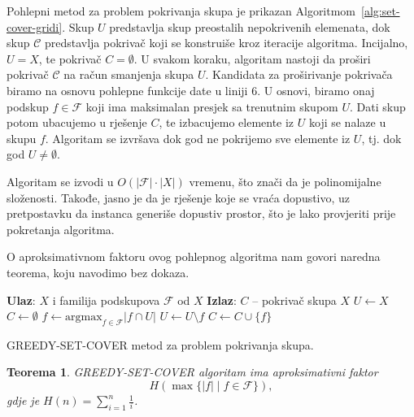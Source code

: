 \documentclass[b5paper, utf8, 11pt, colorlinks]{book}
\newtheorem{thm}{Teorema}[chapter]
\theoremstyle{definition}
\begin{document}
 Pohlepni metod za problem pokrivanja skupa je prikazan Algoritmom~\ref{alg:set-cover-gridi}.  %
Skup $U$ predstavlja skup preostalih nepokrivenih elemenata, dok skup $\mathcal{C}$ predstavlja pokrivač koji se konstruiše kroz iteracije algoritma. Incijalno, $U = X$, te pokrivač $C = \emptyset$.
U svakom koraku, algoritam nastoji da proširi pokrivač $\mathcal{C}$ na račun smanjenja skupa $U$. Kandidata za proširivanje pokrivača biramo na osnovu pohlepne funkcije date u liniji 6. U osnovi, biramo onaj  podskup $f \in \mathcal{F}$ koji ima maksimalan presjek sa trenutnim skupom $U$. Dati skup potom ubacujemo u rješenje $C$, te izbacujemo elemente iz $U$ koji se nalaze u skupu $f$. Algoritam se izvršava dok god ne pokrijemo sve elemente iz $U$, tj. dok god $U \neq \emptyset$.

Algoritam se izvodi u $O(|\mathcal{F}| \cdot |X|)$ vremenu, što znači da je polinomijalne složenosti. Takođe, jasno je da je rješenje koje se vraća dopustivo, uz pretpostavku da instanca generiše dopustiv prostor, što je lako provjeriti prije pokretanja algoritma. 

O aproksimativnom faktoru ovog pohlepnog algoritma nam govori naredna teorema, koju navodimo bez dokaza. %


\begin{algorithm}[!t] 
	\begin{algorithmic}[1]
		\STATE \textbf{Ulaz}: $X$ i familija podskupova $\mathcal{F}$ od $X$
		\STATE \textbf{Izlaz}: $C$ -- pokrivač skupa $X$
		\STATE $U \gets X$
		\STATE $C \gets \emptyset$
		\STATE $f \gets \mbox{argmax}_{f \in \mathcal{F} } |f \cap U | $
		\STATE $U \gets U \setminus f$
		\STATE $C \gets C \cup \{f\}$
		\ENDWHILE
	\end{algorithmic}
	\caption{GREEDY-SET-COVER metod za problem pokrivanja skupa.}
    \label{alg:set-cover-gridi}
\end{algorithm}

\begin{thm}
	  \mbox{GREEDY-SET-COVER} algoritam ima aproksimativni faktor 
	$$ H(\max\{|f| \mid f \in \mathcal{F}\}),$$
	gdje je $H(n) =\sum_{i=1}^n \frac{1}{i}$. 
\end{thm}
\end{document}
